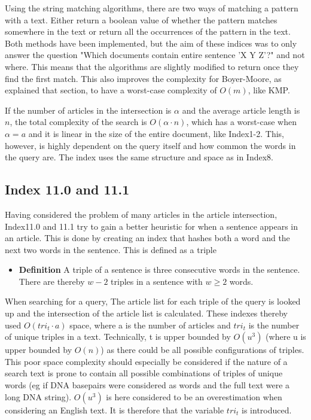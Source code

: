 Using the string matching algorithms, there are two ways of matching a pattern with a text. Either return a boolean value of whether the pattern matches somewhere in the text or return all the occurrences of the pattern in the text. Both methods have been implemented, but the aim of these indices was to only answer the question "Which documents contain entire sentence 'X Y Z'?" and not where. This means that the algorithms are slightly modified to return once they find the first match. This also improves the complexity for Boyer-Moore, as explained that section, to have a worst-case complexity of $O(m)$, like KMP. 

If the number of articles in the intersection is $\alpha$ and the average article length is $n$, the total complexity of the search is $O(\alpha\cdot n)$, which has a worst-case when $\alpha=a$ and it is linear in the size of the entire document, like Index1-2. This, however, is highly dependent on the query itself and how common the words in the query are. The index uses the same structure and space as in Index8. 

\subsection{Index 11.0 and 11.1}
Having considered the problem of many articles in the article intersection, Index11.0 and 11.1 try to gain a better heuristic for when a sentence appears in an article. This is done by creating an index that hashes both a word and the next two words in the sentence. This is defined as a triple

\begin{itemize}
    \item[] \textbf{Definition} A triple of a sentence is three consecutive words in the sentence. \\There are thereby $w-2$ triples in a sentence with $w\geq2$ words.
\end{itemize}

When searching for a query, The article list for each triple of the query is looked up and the intersection of the article list is calculated. These indexes thereby used $O(tri_t\cdot a)$ space, where a is the number of articles and $tri_t$ is the number of unique triples in a text. Technically, t is upper bounded by $O(u^3)$ (where u is upper bounded by $O(n)$) as there could be all possible configurations of triples. This poor space complexity should especially be considered if the nature of a search text is prone to contain all possible combinations of triples of unique words (eg if DNA basepairs were considered as words and the full text were a long DNA string).  $O(u^3)$ is here considered to be an overestimation when considering an English text. It is therefore that the variable $tri_t$ is introduced.

